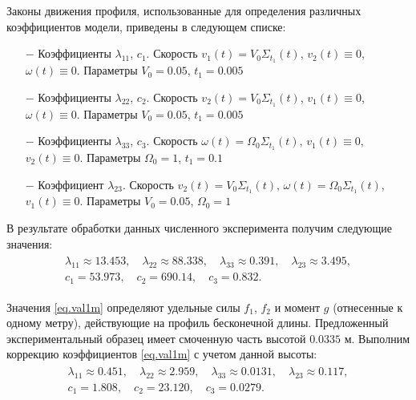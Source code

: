 Законы движения профиля, использованные для определения различных коэффициентов модели, приведены в следующем списке:
\begin{itemize}
	\item[$-$] Коэффициенты $\lambda_{11}$, $c_1$. Скорость $v_1(t) = V_0 \Sigma_{t_1}(t)$, $v_2(t) \equiv 0$, $\omega(t) \equiv 0$. Параметры $V_0 = 0.05$, $t_1 = 0.005$
	\item[$-$] Коэффициенты $\lambda_{22}$, $c_2$. Скорость $v_2(t) = V_0 \Sigma_{t_1}(t)$, $v_1(t) \equiv 0$, $\omega(t) \equiv 0$. Параметры $V_0 = 0.05$, $t_1 = 0.005$
	\item[$-$] Коэффициенты $\lambda_{33}$, $c_3$. Скорость $\omega(t) = \Omega_0 \Sigma_{t_1}(t)$, $v_1(t) \equiv 0$, $v_2(t) \equiv 0$. Параметры $\Omega_0 = 1$, $t_1 = 0.1$
	\item[$-$] Коэффициент $\lambda_{23}$. Скорость $v_2(t) = V_0 \Sigma_{t_1}(t)$, $\omega(t) = \Omega_0 \Sigma_{t_1}(t)$, $v_1(t) \equiv 0$. Параметры $V_0 = 0.05$, $\Omega_0 = 1$
\end{itemize}

В результате обработки данных численного эксперимента получим следующие значения:
\begin{gather}
	\begin{gathered}
		\lambda_{11} \approx 13.453, \quad \lambda_{22} \approx 88.338,\quad \lambda_{33} \approx 0.391,\quad \lambda_{23} \approx 3.495,\\
		c_1 = 53.973,\quad c_2 = 690.14,\quad c_3 = 0.832.
	\end{gathered}\label{eq.val1m}
\end{gather}

Значения \eqref{eq.val1m} определяют удельные силы $f_1$, $f_2$ и момент $g$ (отнесенные к одному метру), действующие на профиль бесконечной длины. Предложенный экспериментальный образец имеет смоченную часть высотой $0.0335$ м. Выполним коррекцию коэффициентов \eqref{eq.val1m} с учетом данной высоты:
\begin{gather}
	\begin{gathered}
		\lambda_{11} \approx 0.451, \quad \lambda_{22} \approx 2.959,\quad \lambda_{33} \approx 0.0131,\quad \lambda_{23} \approx 0.117,\\
		c_1 = 1.808,\quad c_2 = 23.120,\quad c_3 = 0.0279.
	\end{gathered}\label{eq.coeffs1}
\end{gather}



